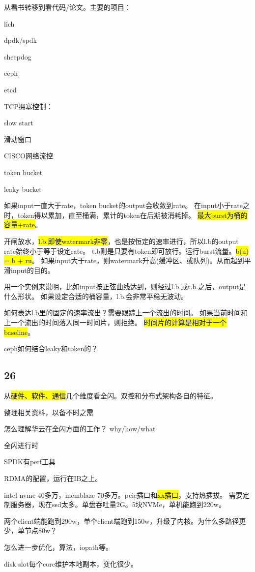 从看书转移到看代码/论文。主要的项目：
\begin{enumbox}
\item lich
\item dpdk/spdk
\item sheepdog
\item ceph
\item etcd
\end{enumbox}

TCP拥塞控制：
\begin{enumbox}
\item slow start
\item 滑动窗口
\end{enumbox}

CISCO网络流控
\begin{enumbox}
\item token bucket
\item leaky bucket
\end{enumbox}

如果input一直大于rate，token bucket的output会收敛到rate。
在input小于rate之时，token得以累加，直至桶满，累计的token在后期被消耗掉。
\hl{最大burst为桶的容量+rate}。

开闸放水，\hl{l.b.即使watermark非零}，也是按恒定的速率进行，所以l.b的output rate始终小于等于设定rate。
t.b则是只要有token即可放行。运行burst流量。\hl{b(u) = b + ru}。
如果input大于rate，则watermark升高(缓冲区、或队列)。从而起到平滑input的目的。

用一个实例来说明，比如input按正弦曲线达到，则经过l.b.或t.b.之后，output是什么形状。
如果设定合适的桶容量，l.b.会非常平稳无波动。

如何表达l.b里的固定的速率流出？需要跟踪上一个流出的时间。
如果当前时间和上一个流出的时间落入同一时间片，则拒绝。
\hl{时间片的计算是相对于一个baseline}。

ceph如何结合leaky和token的？

\subsection{26}

从\hl{硬件、软件、通信}几个维度看全闪。双控和分布式架构各自的特征。

\begin{enumbox}
\item 整理相关资料，以备不时之需
\item 怎么理解华云在全闪方面的工作？ why/how/what
\item 全闪进行时
\item SPDK有perf工具
\end{enumbox}

RDMA的配置，运行在IB之上。

intel nvme 40多万，memblaze 70多万。pcie插口和\hl{xx插口}，支持热插拔。
需要定制服务器，现在ssd太多。单盘吞吐量2G。5块NVMe，单机能跑到220w。

两个client端能跑到290w，单个client端跑到150w，升级了内核。为什么多路径更少，单节点80w？

怎么进一步优化，算法，iopath等。

disk slot每个core维护本地副本，变化很少。
